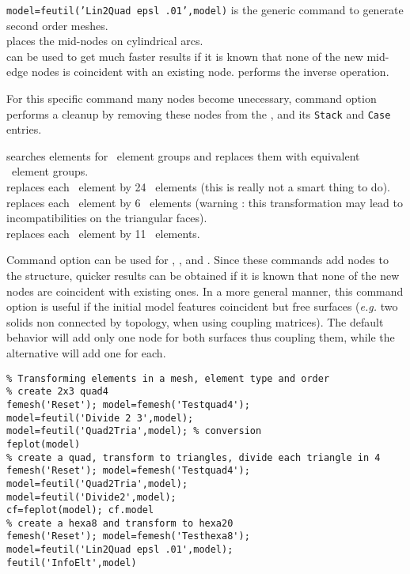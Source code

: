 


{\tt model=feutil('Lin2Quad epsl .01',model)} is the generic command to generate second order meshes.\\
 places the mid-nodes on cylindrical arcs.\\
 can be used to get much faster results if it is known that none of the new mid-edge nodes is coincident with an existing node.
 performs the inverse operation.\\
\begin{SDT}
For this specific command many nodes become unecessary, command option  performs a cleanup by removing these nodes from the , and its {\tt Stack} and {\tt Case} entries.
\end{SDT}
 searches elements for \quada\ element groups and replaces them with equivalent \triaa\ element groups.\\
 replaces each \hexah\ element by 24 \tetra\ elements (this is really not a smart thing to do).\\
 replaces each \hexah\ element by 6 \tetra\ elements (warning : this transformation may lead to incompatibilities on the triangular faces).\\
 replaces each \penta\ element by 11 \tetra\ elements. 

Command option  can be used for , , and  . Since these commands add nodes to the structure, quicker results can be obtained if it is known that none of the new nodes are coincident with existing ones. In a more general manner, this command option is useful if the initial model features coincident but free surfaces ({\it e.g.} two solids non connected by topology, when using coupling matrices). The default behavior will add only one node for both surfaces thus coupling them, while the  alternative will add one for each.

\begin{verbatim}
% Transforming elements in a mesh, element type and order
% create 2x3 quad4 
femesh('Reset'); model=femesh('Testquad4'); 
model=feutil('Divide 2 3',model); 
model=feutil('Quad2Tria',model); % conversion
feplot(model)
% create a quad, transform to triangles, divide each triangle in 4
femesh('Reset'); model=femesh('Testquad4');
model=feutil('Quad2Tria',model);
model=feutil('Divide2',model);
cf=feplot(model); cf.model
% create a hexa8 and transform to hexa20
femesh('Reset'); model=femesh('Testhexa8');
model=feutil('Lin2Quad epsl .01',model);
feutil('InfoElt',model)
\end{verbatim}%


